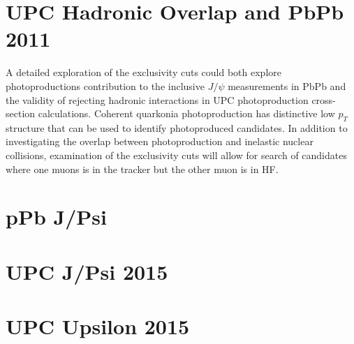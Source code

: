   \section{UPC Hadronic Overlap and PbPb 2011}
    A detailed exploration of the exclusivity cuts could both explore 
      photoproductions contribution to the inclusive $J/\psi$ measurements in
      PbPb and the validity of rejecting hadronic interactions in UPC 
      photoproduction cross-section calculations. 
    Coherent quarkonia photoproduction has distinctive low $p_{T}$ structure
      that can be used to identify photoproduced candidates.
    In addition to investigating the overlap between photoproduction and 
      inelastic nuclear collisions, examination of the exclusivity cuts will 
      allow for search of candidates where one muons is in the tracker but 
      the other muon is in HF. 

  \section{pPb J/Psi}
  \section{UPC J/Psi 2015}
  \section{UPC Upsilon 2015}
